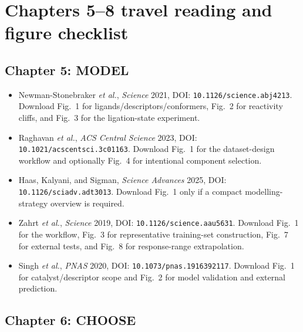 
\chapter*{Chapters 5--8 travel reading and figure checklist}

\section*{Chapter 5: MODEL}

\begin{itemize}
  \item Newman-Stonebraker \textit{et al.}, \textit{Science} 2021, DOI: \texttt{10.1126/science.abj4213}.
  Download Fig.~1 for ligands/descriptors/conformers, Fig.~2 for reactivity cliffs, and Fig.~3 for the ligation-state experiment.
  \item Raghavan \textit{et al.}, \textit{ACS Central Science} 2023, DOI: \texttt{10.1021/acscentsci.3c01163}.
  Download Fig.~1 for the dataset-design workflow and optionally Fig.~4 for intentional component selection.
  \item Haas, Kalyani, and Sigman, \textit{Science Advances} 2025, DOI: \texttt{10.1126/sciadv.adt3013}.
  Download Fig.~1 only if a compact modelling-strategy overview is required.
  \item Zahrt \textit{et al.}, \textit{Science} 2019, DOI: \texttt{10.1126/science.aau5631}.
  Download Fig.~1 for the workflow, Fig.~3 for representative training-set construction, Fig.~7 for external tests, and Fig.~8 for response-range extrapolation.
  \item Singh \textit{et al.}, \textit{PNAS} 2020, DOI: \texttt{10.1073/pnas.1916392117}.
  Download Fig.~1 for catalyst/descriptor scope and Fig.~2 for model validation and external prediction.
\end{itemize}

\section*{Chapter 6: CHOOSE}

